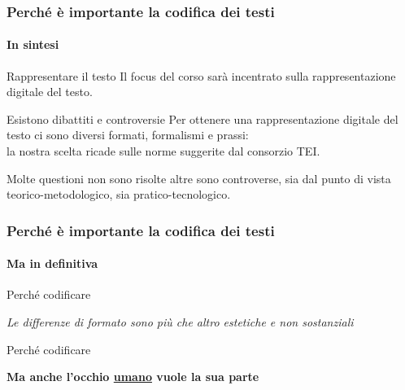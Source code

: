 \begin{frame}
    \frametitle{Perché è importante la codifica dei testi}
    \framesubtitle{In sintesi}
    \addtocounter{nframe}{1}
    
    \begin{block}{Rappresentare il testo}
         Il focus del corso sarà incentrato sulla rappresentazione digitale del testo.
    \end{block}

    \begin{block}{Esistono dibattiti e controversie}
        Per ottenere una rappresentazione digitale del testo ci sono diversi formati, formalismi e prassi:
        \\ la nostra scelta ricade sulle norme suggerite dal consorzio TEI.
    
        Molte questioni non sono risolte altre sono controverse, sia dal punto di vista teorico-metodologico, sia pratico-tecnologico.
   
    \end{block}

\end{frame}

\begin{frame}
    \frametitle{Perché è importante la codifica dei testi}
    \framesubtitle{Ma in definitiva}
    \addtocounter{nframe}{1}
    
    \begin{block}{Perché codificare}

        \begin{center}
            \textit{Le differenze di formato sono più che altro estetiche e non sostanziali}
        \end{center}

    \end{block}
     

    \begin{block}{Perché codificare}

        \begin{center}
            \textbf{Ma anche l'occhio \underline{umano} vuole la sua parte}
        \end{center}
       
    \end{block}

\end{frame}
